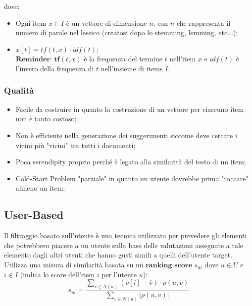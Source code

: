             dove:
                \begin{itemize}
                    \item Ogni item $x \in I$ è un vettore di dimensione $n$, con $n$ che rappresenta il numero di parole nel lessico (creatosi dopo lo stemming, lemming, etc...);
                    \item $x[t] = tf(t, x) \cdot idf(t)$;
                        \\[0.5\baselineskip]
                        $\textbf{Reminder:}$ $\textbf{tf}(t,x)$ è la frequenza del termine $t$ nell'item $x$ e $idf(t)$ è l'invero della frequenza di $t$ nell'insieme di items $I$.
                \end{itemize}

            \subsubsection{Qualità}
                \begin{itemize}
                    \item Facile da costruire in quanto la costruzione di un vettore per ciascuno item non è tanto costoso;
                    \item Non è efficiente nella generazione dei suggerimenti siccome deve cercare i vicini più "vicini" tra tutti i documenti;
                    \item Poca serendipity proprio perché è legato alla similarità del testo di un item;
                    \item Cold-Start Problem "parziale" in quanto un utente dovrebbe prima "toccare" almeno un item.
                \end{itemize}

        \subsection{User-Based}
            Il filtraggio basato sull'utente è una tecnica utilizzata per prevedere gli elementi che potrebbero piacere a un utente sulla base delle valutazioni assegnate a tale elemento dagli altri utenti che hanno gusti simili a quelli dell'utente target.
            \\[1\baselineskip]
            Utilizza una misura di similarità basata su un $\textbf{ranking score}$ $s_{ui}$ dove $u \in U$ e $i \in I$ (indica lo score dell'item $i$ per l'utente $u$):
                $$ s_{ui} = \frac{\sum_{v \in N(u)}{(v[i] - \overline{v}) \cdot \rho(u,v)}}{\sum_{v \in N(u)}{|\rho(u,v)|}} $$

